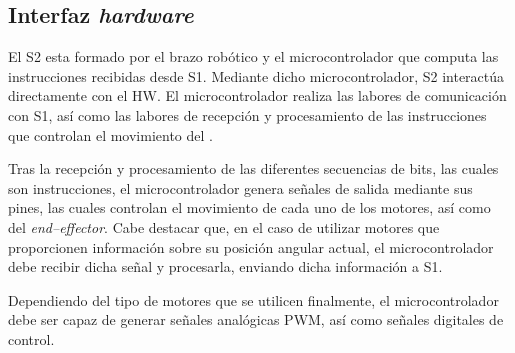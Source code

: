 \subsection{Interfaz \textit{hardware}}
El \ac{S2} esta formado por el brazo robótico \pArm{} y el microcontrolador que computa las instrucciones recibidas desde \ac{S1}. Mediante dicho microcontrolador, \ac{S2} interactúa directamente con el \ac{HW}. El microcontrolador realiza las labores de comunicación con \ac{S1}, así como las labores de recepción y procesamiento de las instrucciones que controlan el movimiento del \pArm{}.

Tras la recepción y procesamiento de las diferentes secuencias de bits, las cuales son instrucciones, el microcontrolador genera señales de salida mediante sus pines, las cuales controlan el movimiento de cada uno de los motores, así como del \textit{end--effector}. Cabe destacar que, en el caso de utilizar motores que proporcionen información sobre su posición angular actual, el microcontrolador debe recibir dicha señal y procesarla, enviando dicha información a \ac{S1}.

Dependiendo del tipo de motores que se utilicen finalmente, el microcontrolador debe ser capaz de generar señales analógicas \ac{PWM}, así como señales digitales de control.





